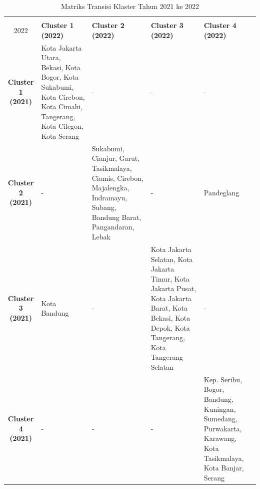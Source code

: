 \begin{table}[H]
\centering
\caption{Matriks Transisi Klaster Tahun 2021 ke 2022} \label{tab:transisi_2021_2022}
\begin{tabular}{|c|p{2cm}|p{2cm}|p{2cm}|p{2cm}|}
\hline
\textbf{Tahun 2021 \\ 2022} & \textbf{Cluster 1 (2022)} & \textbf{Cluster 2 (2022)} & \textbf{Cluster 3 (2022)} & \textbf{Cluster 4 (2022)} \\ \hline
\textbf{Cluster 1 (2021)} & Kota Jakarta Utara, Bekasi, Kota Bogor, Kota Sukabumi, Kota Cirebon, Kota Cimahi, Tangerang, Kota Cilegon, Kota Serang & - & - & - \\ \hline
\textbf{Cluster 2 (2021)} & - & Sukabumi, Cianjur, Garut, Tasikmalaya, Ciamis, Cirebon, Majalengka, Indramayu, Subang, Bandung Barat, Pangandaran, Lebak & - & Pandeglang \\ \hline
\textbf{Cluster 3 (2021)} & Kota Bandung & - & Kota Jakarta Selatan, Kota Jakarta Timur, Kota Jakarta Pusat, Kota Jakarta Barat, Kota Bekasi, Kota Depok, Kota Tangerang, Kota Tangerang Selatan & - \\ \hline
\textbf{Cluster 4 (2021)} & - & - & - & Kep. Seribu, Bogor, Bandung, Kuningan, Sumedang, Purwakarta, Karawang, Kota Tasikmalaya, Kota Banjar, Serang \\ \hline
\end{tabular}
\end{table}